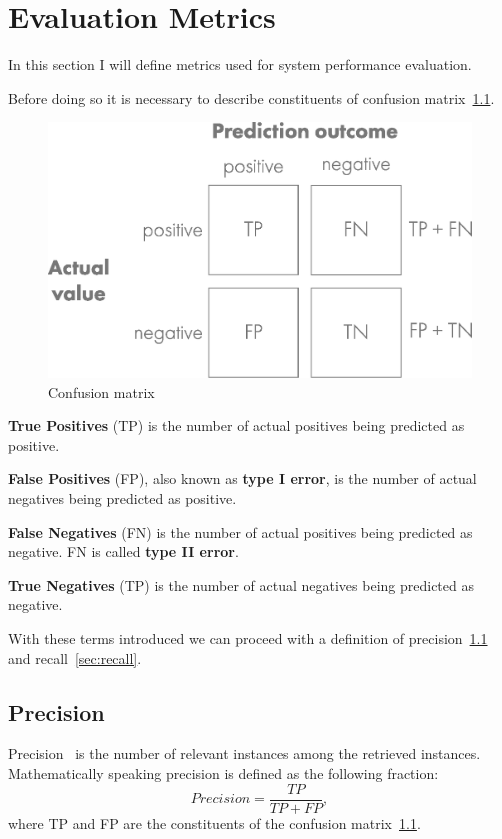 \chapter{Evaluation Metrics}\label{ch:evaluation-metrics}
In this section I will define metrics used for system performance evaluation.

Before doing so it is necessary to describe constituents of confusion matrix~\ref{fig:confusionmat}.

\begin{figure}[H]
    \centering
    \includegraphics[width=0.9\columnwidth]{images/implementation/confusion_matrix.eps}
    \caption{Confusion matrix~\cite{ConfMat}}
    \label{fig:confusionmat}
\end{figure}

\textbf{True Positives} (TP) is the number of actual positives being predicted as positive.

\textbf{False Positives} (FP), also known as \textbf{type I error}, is the number of actual negatives being predicted
as positive.

\textbf{False Negatives} (FN) is the number of actual positives being predicted as negative.
FN is called \textbf{type II error}.

\textbf{True Negatives} (TP) is the number of actual negatives being predicted as negative.

With these terms introduced we can proceed with a definition of precision~\ref{sec:precision} and
recall~\ref{sec:recall}.

\section{Precision}\label{sec:precision}
Precision~\cite{PreRec} is the number of relevant instances among the retrieved instances.
Mathematically speaking precision is defined as the following fraction:
\begin{equation}
    Precision = \frac{TP}{TP + FP},
\end{equation}
where TP and FP are the constituents of the confusion matrix~\ref{fig:confusionmat}.

